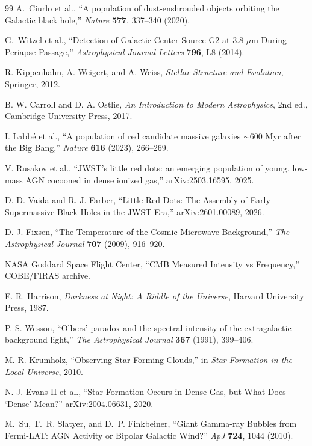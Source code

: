 \documentclass[11pt,a4paper]{article}
\begin{document}
\begin{thebibliography}{99}
A.~Ciurlo et al.,
``A population of dust-enshrouded objects orbiting the Galactic black hole,''
\textit{Nature} \textbf{577}, 337--340 (2020).

G.~Witzel et al.,
``Detection of Galactic Center Source G2 at 3.8 \(\mu\)m During Periapse Passage,''
\textit{Astrophysical Journal Letters} \textbf{796}, L8 (2014).

R. Kippenhahn, A. Weigert, and A. Weiss,
{\em Stellar Structure and Evolution},
Springer, 2012.

B. W. Carroll and D. A. Ostlie,
{\em An Introduction to Modern Astrophysics},
2nd ed., Cambridge University Press, 2017.

I. Labbé et al.,
``A population of red candidate massive galaxies \(\sim600\) Myr after the Big Bang,''
{\em Nature} {\bf 616} (2023), 266--269.

V. Rusakov et al.,
``JWST's little red dots: an emerging population of young, low-mass AGN cocooned in dense ionized gas,''
arXiv:2503.16595, 2025.

D. D. Vaida and R. J. Farber,
``Little Red Dots: The Assembly of Early Supermassive Black Holes in the JWST Era,''
arXiv:2601.00089, 2026.

D. J. Fixsen,
``The Temperature of the Cosmic Microwave Background,''
{\em The Astrophysical Journal} {\bf 707} (2009), 916--920.

NASA Goddard Space Flight Center,
``CMB Measured Intensity vs Frequency,''
COBE/FIRAS archive.

E. R. Harrison,
{\em Darkness at Night: A Riddle of the Universe},
Harvard University Press, 1987.

P. S. Wesson,
``Olbers' paradox and the spectral intensity of the extragalactic background light,''
{\em The Astrophysical Journal} {\bf 367} (1991), 399--406.

M. R. Krumholz,
``Observing Star-Forming Clouds,''
in {\em Star Formation in the Local Universe}, 2010.

N. J. Evans II et al.,
``Star Formation Occurs in Dense Gas, but What Does `Dense' Mean?''
arXiv:2004.06631, 2020.

M.~Su, T.~R. Slatyer, and D.~P. Finkbeiner, ``Giant Gamma-ray Bubbles from
Fermi-LAT: AGN Activity or Bipolar Galactic Wind?'' \textit{ApJ} \textbf{724},
1044 (2010).


\end{thebibliography}
\end{document}
